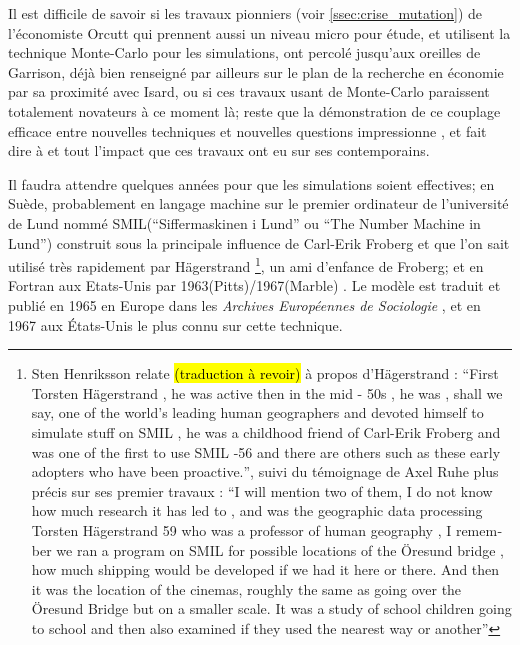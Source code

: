 Il est difficile de savoir si les travaux pionniers (voir \ref{ssec:crise_mutation}) de l'économiste Orcutt \autocite{Orcutt1957, Orcutt1960} qui prennent aussi un niveau micro pour étude, et utilisent la technique Monte-Carlo pour les simulations, ont percolé jusqu'aux oreilles de Garrison, déjà bien renseigné par ailleurs sur le plan de la recherche en économie par sa proximité avec Isard, ou si ces travaux usant de Monte-Carlo paraissent totalement novateurs à ce moment là; reste que la démonstration de ce couplage efficace entre nouvelles techniques et nouvelles questions impressionne \autocite[120]{Unwin1992}, et fait dire à \textcite{Morril2005} et \textcite{Gould1970} tout l'impact que ces travaux ont eu sur ses contemporains.

Il faudra attendre quelques années pour que les simulations soient effectives; en Suède, probablement en langage machine sur le premier ordinateur de l'université de Lund nommé SMIL(\foreignquote{sweden}{Siffermaskinen i Lund} ou \foreignquote{english}{The Number Machine in Lund}) construit sous la principale influence de Carl-Erik Froberg et que l'on sait utilisé très rapidement par Hägerstrand \footnote{\autocite[32-33]{Lindgren2008} Sten Henriksson relate \hl{(traduction à revoir)} à propos d'Hägerstrand : \foreignquote{english}{First Torsten Hägerstrand , he was active then in the mid - 50s , he was , shall we say, one of the world's leading human geographers and devoted himself to simulate stuff on SMIL , he was a childhood friend of Carl-Erik Froberg and was one of the first to use SMIL -56 and there are others such as these early adopters who have been proactive.}, suivi du témoignage de Axel Ruhe plus précis sur ses premier travaux : \foreignquote{english}{I will mention two of them, I do not know how much research it has led to , and was the geographic data processing Torsten Hägerstrand 59 who was a professor of human geography , I remember we ran a program on SMIL for possible locations of the Öresund bridge , how much shipping would be developed if we had it here or there. And then it was the location of the cinemas, roughly the same as going over the Öresund Bridge but on a smaller scale. It was a study of school children going to school and then also examined if they used the nearest way or another}}, un ami d'enfance de Froberg; et en Fortran aux Etats-Unis par 1963(Pitts)/1967(Marble) \autocite{Morril2005, Marble1972, Pitts1963}. Le modèle est traduit et publié en 1965 en Europe dans les \textit{Archives Européennes de Sociologie} \autocite{Hagerstrand1965}, et en 1967 \autocite{Hagerstrand1967a} aux États-Unis le plus connu sur cette technique. 


